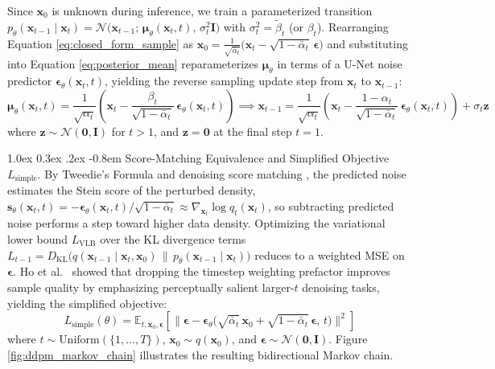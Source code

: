 \documentclass[10pt,a4paper]{article}
\makeatletter
\renewcommand\paragraph{\@startsection{paragraph}{4}{\z@}%
                                    {1.0ex \@plus 0.3ex \@minus .2ex}%
                                    {-0.8em}%
                                    {\normalfont\normalsize\bfseries}}
\makeatother
\begin{document}
Since $\mathbf{x}_0$ is unknown during inference, we train a parameterized transition $p_\theta(\mathbf{x}_{t-1} \mid \mathbf{x}_t) = \mathcal{N}\big(\mathbf{x}_{t-1}; \, \bm{\mu}_\theta(\mathbf{x}_t, t), \, \sigma_t^2 \mathbf{I}\big)$ with $\sigma_t^2 = \tilde{\beta}_t$ (or $\beta_t$). Rearranging Equation \eqref{eq:closed_form_sample} as $\mathbf{x}_0 = \frac{1}{\sqrt{\bar{\alpha}_t}}\big(\mathbf{x}_t - \sqrt{1 - \bar{\alpha}_t}\,\bm{\epsilon}\big)$ and substituting into Equation \eqref{eq:posterior_mean} reparameterizes $\bm{\mu}_\theta$ in terms of a U-Net noise predictor $\bm{\epsilon}_\theta(\mathbf{x}_t, t)$, yielding the reverse sampling update step from $\mathbf{x}_t$ to $\mathbf{x}_{t-1}$:
\begin{equation}
    \bm{\mu}_\theta(\mathbf{x}_t, t) = \frac{1}{\sqrt{\alpha_t}}\left(\mathbf{x}_t - \frac{\beta_t}{\sqrt{1 - \bar{\alpha}_t}}\,\bm{\epsilon}_\theta(\mathbf{x}_t, t)\right) \implies \mathbf{x}_{t-1} = \frac{1}{\sqrt{\alpha_t}}\left(\mathbf{x}_t - \frac{1 - \alpha_t}{\sqrt{1 - \bar{\alpha}_t}}\,\bm{\epsilon}_\theta(\mathbf{x}_t, t)\right) + \sigma_t \mathbf{z}
    \label{eq:reverse_sample_step}
\end{equation}
where $\mathbf{z} \sim \mathcal{N}(\mathbf{0}, \mathbf{I})$ for $t > 1$, and $\mathbf{z} = \mathbf{0}$ at the final step $t = 1$.

\paragraph{Score-Matching Equivalence and Simplified Objective $L_{\text{simple}}$.}
By Tweedie's Formula and denoising score matching \cite{song2019generative, ho2020denoising}, the predicted noise estimates the Stein score of the perturbed density, $\mathbf{s}_\theta(\mathbf{x}_t, t) = -\bm{\epsilon}_\theta(\mathbf{x}_t, t)/\sqrt{1 - \bar{\alpha}_t} \approx \nabla_{\mathbf{x}_t} \log q_t(\mathbf{x}_t)$, so subtracting predicted noise performs a step toward higher data density. Optimizing the variational lower bound $L_{\text{VLB}}$ over the KL divergence terms $L_{t-1} = D_{\text{KL}}\big(q(\mathbf{x}_{t-1}\mid\mathbf{x}_t,\mathbf{x}_0) \,\parallel\, p_\theta(\mathbf{x}_{t-1}\mid\mathbf{x}_t)\big)$ reduces to a weighted MSE on $\bm{\epsilon}$. Ho et al.\ \cite{ho2020denoising} showed that dropping the timestep weighting prefactor improves sample quality by emphasizing perceptually salient larger-$t$ denoising tasks, yielding the simplified objective:
\begin{equation}
    L_{\text{simple}}(\theta) = \mathbb{E}_{t, \mathbf{x}_0, \bm{\epsilon}}\left[\big\|\bm{\epsilon} - \bm{\epsilon}_\theta\big(\sqrt{\bar{\alpha}_t}\,\mathbf{x}_0 + \sqrt{1 - \bar{\alpha}_t}\,\bm{\epsilon}, \, t\big)\big\|^2\right]
    \label{eq:l_simple}
\end{equation}
where $t \sim \text{Uniform}(\{1, \dots, T\})$, $\mathbf{x}_0 \sim q(\mathbf{x}_0)$, and $\bm{\epsilon} \sim \mathcal{N}(\mathbf{0}, \mathbf{I})$. Figure \ref{fig:ddpm_markov_chain} illustrates the resulting bidirectional Markov chain.
\end{document}

